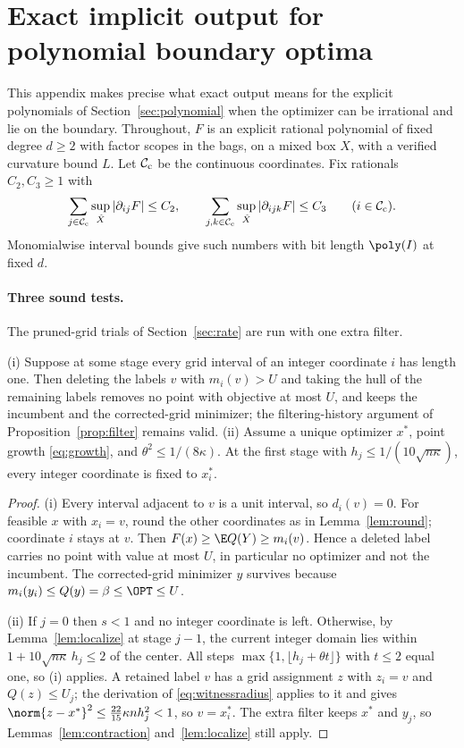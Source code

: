 \section{Exact implicit output for polynomial boundary optima}\label{app:boundary}

This appendix makes precise what exact output means for the explicit
polynomials of Section~\ref{sec:polynomial} when the optimizer can be
irrational and lie on the boundary. Throughout, $F$ is an explicit rational
polynomial of fixed degree $d\ge2$ with factor scopes in the bags, on a mixed
box $X$, with a verified curvature bound $L$. Let $\mathcal C_{\rm c}$ be the
continuous coordinates. Fix rationals $C_2,C_3\ge1$ with
\[
\sum_{j\in\mathcal C_{\rm c}}\sup_{\hat X}|\partial_{ij}F|\le C_2,\qquad
\sum_{j,k\in\mathcal C_{\rm c}}\sup_{\hat X}|\partial_{ijk}F|\le C_3
\qquad(i\in\mathcal C_{\rm c}).
\]
Monomialwise interval bounds give such numbers with bit length $\poly(I)$
at fixed $d$.

\paragraph{Three sound tests.}
The pruned-grid trials of Section~\ref{sec:rate} are run with one extra filter.

\begin{lemma}\label{lem:labelfilter}
(i) Suppose at some stage every grid interval of an integer coordinate $i$
has length one. Then deleting the labels $v$ with $m_i(v)>U$ and taking the
hull of the remaining labels removes no point with objective at most $U$, and
keeps the incumbent and the corrected-grid minimizer; the filtering-history
argument of Proposition~\ref{prop:filter} remains valid.
(ii) Assume a unique optimizer $x^*$, point growth \eqref{eq:growth}, and
$\theta^2\le1/(8\kappa)$. At the first stage with
$h_j\le1/(10\sqrt{n\kappa})$, every integer coordinate is fixed to $x^*_i$.
\end{lemma}

\begin{proof}
(i) Every interval adjacent to $v$ is a unit interval, so $d_i(v)=0$. For
feasible $x$ with $x_i=v$, round the other coordinates as in
Lemma~\ref{lem:round}; coordinate $i$ stays at $v$. Then
$F(x)\ge\E Q(Y)\ge m_i(v)$. Hence a deleted label carries no point with
value at most $U$, in particular no optimizer and not the incumbent. The
corrected-grid minimizer $y$ survives because $m_i(y_i)\le Q(y)=\beta\le\OPT\le U$.

(ii) If $j=0$ then $s<1$ and no integer coordinate is left. Otherwise, by
Lemma~\ref{lem:localize} at stage $j-1$, the current integer domain lies
within $1+10\sqrt{n\kappa}\,h_j\le2$ of the center. All steps
$\max\{1,\lfloor h_j+\theta t\rfloor\}$ with $t\le2$ equal one, so (i) applies.
A retained label $v$ has a grid assignment $z$ with $z_i=v$ and
$Q(z)\le U_j$; the derivation of \eqref{eq:witnessradius} applies to it and
gives $\norm{z-x^*}^2\le\frac{22}{15}\kappa nh_j^2<1$, so $v=x^*_i$.
The extra filter keeps $x^*$ and $y_j$, so Lemmas~\ref{lem:contraction}
and~\ref{lem:localize} still apply.
\end{proof}

